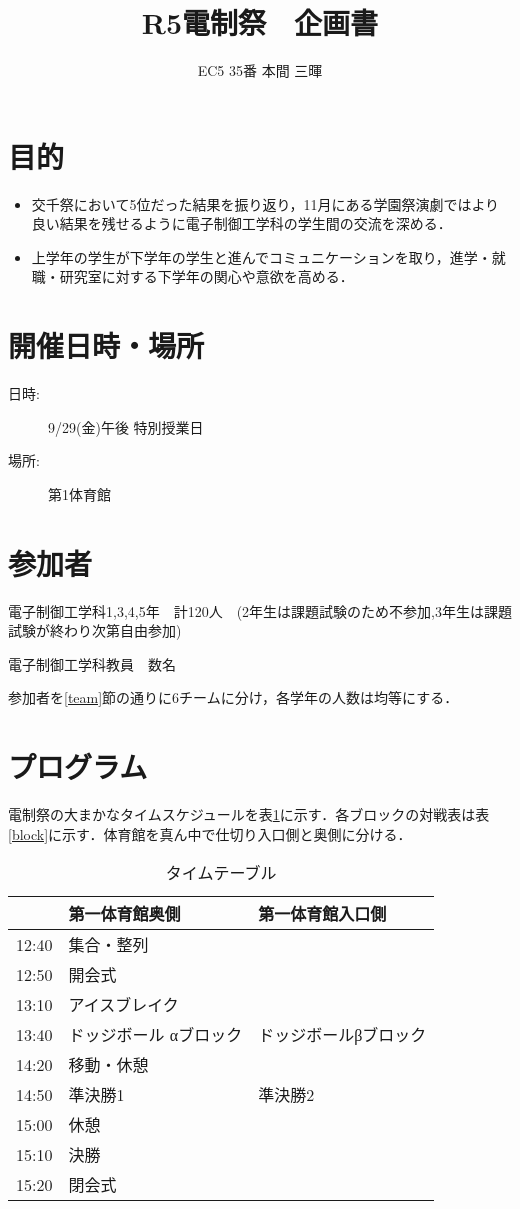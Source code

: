 \documentclass[dvipdfmx]{jsarticle}
\begin{document}
\title{R5電制祭　企画書}
\author{EC5 35番 本間 三暉}
\maketitle

\section{目的}
\begin{itemize}
  \item 交千祭において5位だった結果を振り返り，11月にある学園祭演劇ではより良い結果を残せるように電子制御工学科の学生間の交流を深める．
  \item 上学年の学生が下学年の学生と進んでコミュニケーションを取り，進学・就職・研究室に対する下学年の関心や意欲を高める．
\end{itemize}

\section{開催日時・場所}
\begin{description}
  \item[日時:] 9/29(金)午後 特別授業日
  \item[場所:] 第1体育館
\end{description}
\section{参加者}
電子制御工学科1,3,4,5年　計120人　(2年生は課題試験のため不参加,3年生は課題試験が終わり次第自由参加)

電子制御工学科教員　数名


参加者を\ref{team}節の通りに6チームに分け，各学年の人数は均等にする．
\section{プログラム}
電制祭の大まかなタイムスケジュールを表\ref{time}に示す．各ブロックの対戦表は表\ref{block}に示す．体育館を真ん中で仕切り入口側と奥側に分ける．
\begin{table}[H]

  \caption{タイムテーブル}
  \label{time}
  \centering
  \begin{tabular}{l||l|l}
          & 第一体育館奥側      & 第一体育館入口側    \\\hline\hline
    12:40 & 集合・整列        &             \\
    12:50 & 開会式          &             \\
    13:10 & アイスブレイク      &             \\
    13:40 & ドッジボール αブロック & ドッジボールβブロック \\
    14:20 & 移動・休憩        &             \\
    14:50 & 準決勝1         & 準決勝2        \\
    15:00 & 休憩           &             \\
    15:10 & 決勝           &             \\
    15:20 & 閉会式          &
  \end{tabular}
\end{table}
\end{document}
